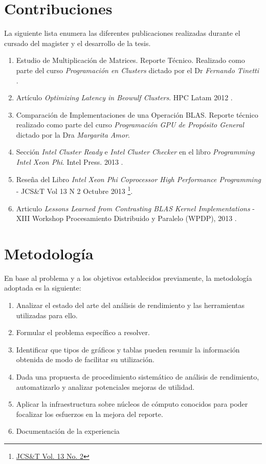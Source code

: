 \documentclass[a4paper]{report}
\begin{document}
\section{Contribuciones}

La siguiente lista enumera las diferentes publicaciones realizadas durante el cursado del magister y el desarrollo de la tesis.

\begin{enumerate}
\item Estudio de Multiplicación de Matrices. Reporte Técnico. Realizado como parte del curso {\it Programación en Clusters} dictado por el Dr {\it Fernando Tinetti} \cite{mm-tool}.
\item Artículo {\it Optimizing Latency in Beowulf Clusters}. HPC Latam 2012 \cite{latency}.
\item Comparación de Implementaciones de una Operación BLAS. Reporte técnico realizado como parte del curso {\it Programación GPU de Propósito General} dictado por la Dra {\it Margarita Amor}.
\item Sección {\it Intel Cluster Ready} e {\it Intel Cluster Checker} en el libro {\it Programming Intel Xeon Phi}. Intel Press. 2013 \cite{xeonphi}.
\item Reseña del Libro {\it Intel Xeon Phi Coprocessor High Performance Programming} - JCS\&T Vol 13 N 2 Octubre 2013 \footnote{\href{http://journal.info.unlp.edu.ar/journal/journal36/papers/JCST-Oct13-BR1.pdf}{JCS\&T Vol. 13 No. 2}}.
\item Articulo {\it Lessons Learned from Contrasting BLAS Kernel Implementations} - XIII Workshop Procesamiento Distribuido y Paralelo (WPDP), 2013 \cite{lessons}.
\end{enumerate}

\section{Metodología}

En base al problema y a los objetivos establecidos previamente, la metodología adoptada es la siguiente:

\begin{enumerate}
\item Analizar el estado del arte del análisis de rendimiento y las herramientas utilizadas para ello.
\item Formular el problema específico a resolver.
\item Identificar que tipos de gráficos y tablas pueden resumir la información obtenida de modo de facilitar su utilización.
\item Dada una propuesta de procedimiento sistemático de análisis de rendimiento, automatizarlo y analizar potenciales mejoras de utilidad.
\item Aplicar la infraestructura sobre núcleos de cómputo conocidos para poder focalizar los esfuerzos en la mejora del reporte.
\item Documentación de la experiencia
\end{enumerate}
\end{document}
